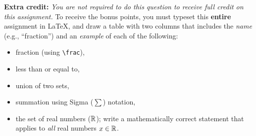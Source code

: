 \documentclass[11pt,addpoints]{exam}
\begin{document}
\begin{questions}
  \bonusquestion[10] \textbf{Extra credit:} \emph{You are not required to do this question to receive full credit on this assignment.}
  To receive the bonus points, you must typeset this \textbf{entire} assignment in \LaTeX, and draw a table with two columns that includes the \emph{name} (e.g., ``fraction'') and an \emph{example} of each of the following:
  \begin{itemize}
  \item fraction (using \texttt{\textbackslash frac}),
  \item less than or equal to,
  \item union of two sets,
  \item summation using Sigma ($\sum$) notation,
  \item the set of real numbers ($\mathbb{R}$); write a mathematically correct statement that applies to \emph{all} real numbers $x\in \mathbb{R}$.
  \end{itemize}
  
  \begin{solution}
    
    \end{solution}

\end{questions}
\end{document}
